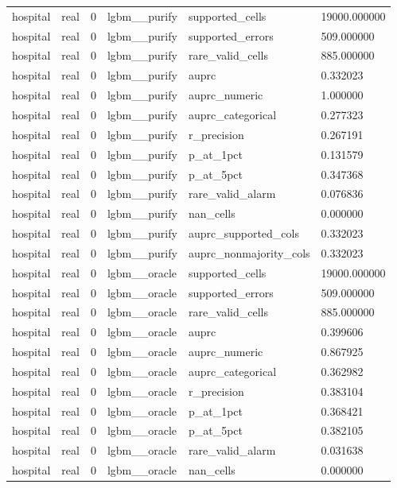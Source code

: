 \begin{tabular}{llllll}
hospital & real & 0 & lgbm\_\_purify & supported\_cells & 19000.000000 \\
hospital & real & 0 & lgbm\_\_purify & supported\_errors & 509.000000 \\
hospital & real & 0 & lgbm\_\_purify & rare\_valid\_cells & 885.000000 \\
hospital & real & 0 & lgbm\_\_purify & auprc & 0.332023 \\
hospital & real & 0 & lgbm\_\_purify & auprc\_numeric & 1.000000 \\
hospital & real & 0 & lgbm\_\_purify & auprc\_categorical & 0.277323 \\
hospital & real & 0 & lgbm\_\_purify & r\_precision & 0.267191 \\
hospital & real & 0 & lgbm\_\_purify & p\_at\_1pct & 0.131579 \\
hospital & real & 0 & lgbm\_\_purify & p\_at\_5pct & 0.347368 \\
hospital & real & 0 & lgbm\_\_purify & rare\_valid\_alarm & 0.076836 \\
hospital & real & 0 & lgbm\_\_purify & nan\_cells & 0.000000 \\
hospital & real & 0 & lgbm\_\_purify & auprc\_supported\_cols & 0.332023 \\
hospital & real & 0 & lgbm\_\_purify & auprc\_nonmajority\_cols & 0.332023 \\
hospital & real & 0 & lgbm\_\_oracle & supported\_cells & 19000.000000 \\
hospital & real & 0 & lgbm\_\_oracle & supported\_errors & 509.000000 \\
hospital & real & 0 & lgbm\_\_oracle & rare\_valid\_cells & 885.000000 \\
hospital & real & 0 & lgbm\_\_oracle & auprc & 0.399606 \\
hospital & real & 0 & lgbm\_\_oracle & auprc\_numeric & 0.867925 \\
hospital & real & 0 & lgbm\_\_oracle & auprc\_categorical & 0.362982 \\
hospital & real & 0 & lgbm\_\_oracle & r\_precision & 0.383104 \\
hospital & real & 0 & lgbm\_\_oracle & p\_at\_1pct & 0.368421 \\
hospital & real & 0 & lgbm\_\_oracle & p\_at\_5pct & 0.382105 \\
hospital & real & 0 & lgbm\_\_oracle & rare\_valid\_alarm & 0.031638 \\
hospital & real & 0 & lgbm\_\_oracle & nan\_cells & 0.000000 \\

\end{tabular}

